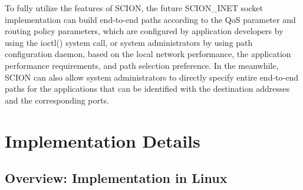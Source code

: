 To fully utilize the features of SCION, the future SCION\_INET
socket implementation can build end-to-end paths according to the
QoS parameter and routing policy parameters, which are configured by
application developers by using the ioctl() system call, or system
administrators by using path configuration daemon, based on the
local network performance, the application performance requirements,
and path selection preference. In the meanwhile, SCION can also
allow system administrators to directly specify entire end-to-end
paths for the applications that can be identified with the
destination addresses and the corresponding ports.






\section{Implementation Details}

\subsection{Overview: Implementation in Linux}

